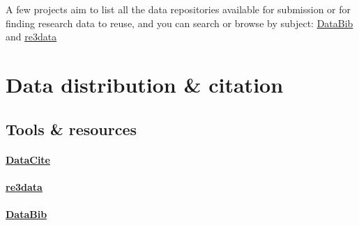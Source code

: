 \documentclass{tufte-handout}
\begin{document}
A few projects aim to list all the data repositories available for submission or for finding research data to reuse, and you can search or browse by subject: \href{http://databib.org/}{DataBib} and \href{http://www.re3data.org}{re3data}


\section{Data distribution \& citation}\label{data-distribution-citation} 

\subsection{Tools \& resources}\label{what-tools-and-resources-are-available-3}

\paragraph{\href{https://www.datacite.org/}{DataCite}}\label{datacite}

\paragraph{\href{http://www.re3data.org}{re3data}}\label{re3}

\paragraph{\href{http://databib.org/}{DataBib}}\label{databib}
\end{document}
